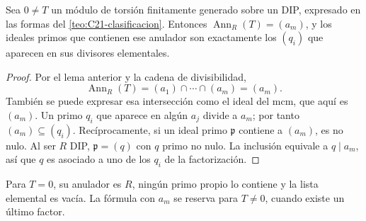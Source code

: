 \begin{lema}\label{lema:C21-primos-anulador}
Sea $0\ne T$ un módulo de torsión finitamente generado sobre un DIP, expresado en las formas del \cref{teo:C21-clasificacion}. Entonces $\operatorname{Ann}_R(T)=(a_m)$, y los ideales primos que contienen ese anulador son exactamente los $(q_i)$ que aparecen en sus divisores elementales.
\end{lema}
\begin{proof}
Por el lema anterior y la cadena de divisibilidad,
\[
\operatorname{Ann}_R(T)=(a_1)\cap\cdots\cap(a_m)=(a_m).
\]
También se puede expresar esa intersección como el ideal del mcm, que aquí es $(a_m)$. Un primo $q_i$ que aparece en algún $a_j$ divide a $a_m$; por tanto $(a_m)\subseteq(q_i)$. Recíprocamente, si un ideal primo $\mathfrak p$ contiene a $(a_m)$, es no nulo. Al ser $R$ DIP, $\mathfrak p=(q)$ con $q$ primo no nulo. La inclusión equivale a $q\mid a_m$, así que $q$ es asociado a uno de los $q_i$ de la factorización.
\end{proof}
Para $T=0$, su anulador es $R$, ningún primo propio lo contiene y la lista elemental es vacía. La fórmula con $a_m$ se reserva para $T\ne0$, cuando existe un último factor.

